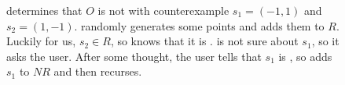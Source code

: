 \begin{figure*}[ht]
\begin{subfigure}[t]{0.58\textwidth}
    \caption{%
      \Helper{} determines that $O$ is not  with
      counterexample $s_1 = (-1, 1)$ and $s_2 = (1, -1)$. \Helper{} randomly
      generates some \sTIreachable{} points and adds them to $R$. Luckily for
      us, $s_2 \in R$, so \Helper{} knows that it is \sTIreachable{}.
      \Helper{} is not sure about $s_1$, so it asks the user. After some
      thought, the user tells \Helper{} that $s_1$ is \sTIunreachable{}, so
      \Helper{} adds $s_1$ to $NR$ and then recurses.
    }
  \end{subfigure}


\end{figure*}
